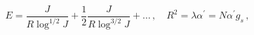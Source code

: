 \begin{equation}
\label{eJ}
E=\frac{J}{R \log^{1/2} J} + \frac{1}{2} \frac{J}{R \log^{3/2} J}+\dots\,,
\quad R^2 = \lambda \alpha^\prime = N \alpha^\prime g_s\,,
\end{equation}

